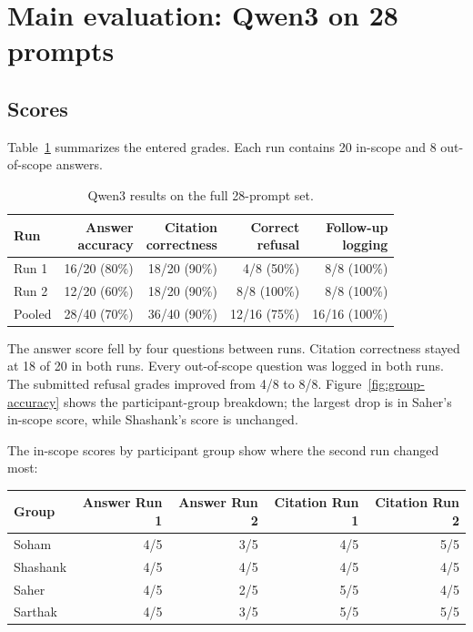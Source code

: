 \documentclass[11pt,a4paper]{article}
\begin{document}
\section{Main evaluation: Qwen3 on 28 prompts}

\subsection{Scores}

Table~\ref{tab:main-qwen} summarizes the entered grades. Each run contains 20 in-scope and 8 out-of-scope answers.

\begin{table}[htbp]
\centering
\caption{Qwen3 results on the full 28-prompt set.}
\label{tab:main-qwen}
\begin{tabular}{lrrrr}
\toprule
Run & \shortstack{Answer\\accuracy} & \shortstack{Citation\\correctness} & \shortstack{Correct\\refusal} & \shortstack{Follow-up\\logging} \\
\midrule
Run 1 & 16/20 (80\%) & 18/20 (90\%) & 4/8 (50\%) & 8/8 (100\%) \\
Run 2 & 12/20 (60\%) & 18/20 (90\%) & 8/8 (100\%) & 8/8 (100\%) \\
Pooled & 28/40 (70\%) & 36/40 (90\%) & 12/16 (75\%) & 16/16 (100\%) \\
\bottomrule
\end{tabular}
\end{table}

The answer score fell by four questions between runs. Citation correctness stayed at 18 of 20 in both runs. Every out-of-scope question was logged in both runs. The submitted refusal grades improved from 4/8 to 8/8. Figure~\ref{fig:group-accuracy} shows the participant-group breakdown; the largest drop is in Saher's in-scope score, while Shashank's score is unchanged.

The in-scope scores by participant group show where the second run changed most:
\begin{center}
\small
\begin{tabular}{lrrrr}
\toprule
Group & Answer Run 1 & Answer Run 2 & Citation Run 1 & Citation Run 2 \\
\midrule
Soham & 4/5 & 3/5 & 4/5 & 5/5 \\
Shashank & 4/5 & 4/5 & 4/5 & 4/5 \\
Saher & 4/5 & 2/5 & 5/5 & 4/5 \\
Sarthak & 4/5 & 3/5 & 5/5 & 5/5 \\
\bottomrule
\end{tabular}
\end{center}
\end{document}
